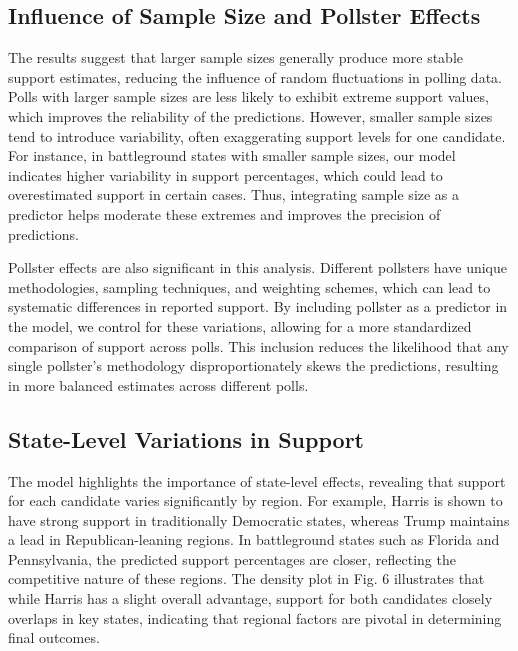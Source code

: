 \documentclass[
  letterpaper,
  DIV=11,
  numbers=noendperiod]{scrartcl}
\begin{document}
\subsection{Influence of Sample Size and Pollster
Effects}\label{influence-of-sample-size-and-pollster-effects}

The results suggest that larger sample sizes generally produce more
stable support estimates, reducing the influence of random fluctuations
in polling data. Polls with larger sample sizes are less likely to
exhibit extreme support values, which improves the reliability of the
predictions. However, smaller sample sizes tend to introduce
variability, often exaggerating support levels for one candidate. For
instance, in battleground states with smaller sample sizes, our model
indicates higher variability in support percentages, which could lead to
overestimated support in certain cases. Thus, integrating sample size as
a predictor helps moderate these extremes and improves the precision of
predictions.

Pollster effects are also significant in this analysis. Different
pollsters have unique methodologies, sampling techniques, and weighting
schemes, which can lead to systematic differences in reported support.
By including pollster as a predictor in the model, we control for these
variations, allowing for a more standardized comparison of support
across polls. This inclusion reduces the likelihood that any single
pollster's methodology disproportionately skews the predictions,
resulting in more balanced estimates across different polls.

\subsection{State-Level Variations in
Support}\label{state-level-variations-in-support}

The model highlights the importance of state-level effects, revealing
that support for each candidate varies significantly by region. For
example, Harris is shown to have strong support in traditionally
Democratic states, whereas Trump maintains a lead in Republican-leaning
regions. In battleground states such as Florida and Pennsylvania, the
predicted support percentages are closer, reflecting the competitive
nature of these regions. The density plot in Fig. 6 illustrates that
while Harris has a slight overall advantage, support for both candidates
closely overlaps in key states, indicating that regional factors are
pivotal in determining final outcomes.
\end{document}

